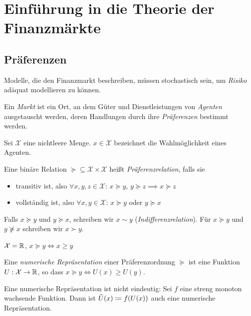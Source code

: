 \documentclass[a4paper,twoside,DIV15,BCOR12mm]{scrbook}
\newcommand{\cX}{\mathcal X}
\begin{document}
\renewcommand{\thesection}{\arabic{chapter}.\arabic{section}}
\renewcommand{\thechapter}{\Roman{chapter}}

\chapter{Einführung in die Theorie der Finanzmärkte}

\section{Präferenzen}

Modelle, die den Finanzmarkt beschreiben, müssen stochastisch sein, um \emph{Risiko} adäquat modellieren zu können.

Ein \emph{Markt} ist ein Ort, an dem Güter und Dienstleistungen von \emph{Agenten} ausgetauscht werden, deren Handlungen durch ihre \emph{Präferenzen} bestimmt werden.

Sei $\cX$ eine nichtleere Menge. $x\in\cX$ bezeichnet die Wahlmöglichkeit eines Agenten.

\begin{definition}
Eine binäre Relation $\succeq \subseteq \cX \times \cX$ heißt \emph{Präferenzrelation}, falls sie
\begin{itemize}
\item transitiv ist, also $\forall x,y,z \in\cX$: $x\succeq y$, $y\succeq z \implies x\succeq z$
\item vollständig ist, also $\forall x,y\in \cX$: $x\succeq y$ oder $y\succeq x$
\end{itemize}
Falls $x\succeq y$ und $y\succeq x$, schreiben wir $x\sim y$ (\emph{Indifferenzrelation}). Für $x\succeq y$ und $y\not\succeq x$ schreiben wir $x\succ y$.
\end{definition}

\begin{beispiel}
$\cX=\MdR$, $x\succeq y \iff x\ge y$
\end{beispiel}

\begin{definition}
Eine \emph{numerische Repräsentation} einer Präferenzordnung $\succeq$ ist eine Funktion $U:\cX\to \MdR$, so dass $x\succeq y \iff U(x) \ge U(y)$.
\end{definition}

\begin{bemerkung}
Eine numerische Repräsentation ist nicht eindeutig: Sei $f$ eine streng monoton wachsende Funktion. Dann ist $\tilde U(x) \da f(U(x))$ auch eine numerische Repräsentation.
\end{bemerkung}
\end{document}
